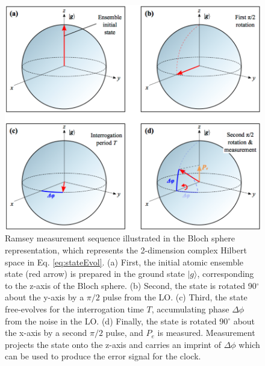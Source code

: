 \begin{figure}[hp]
    \begin{center}
        \includegraphics{figures/5/Fig_BlochRamsey2}
        \caption{\label{fig:bloch} Ramsey measurement sequence illustrated in the Bloch sphere representation, which represents the 2-dimension complex Hilbert space in  Eq. \ref{eq:stateEvol}. (a) First, the initial atomic ensemble state (red arrow) is prepared in the ground state $|g \rangle$, corresponding to the z-axis of the Bloch sphere. (b) Second, the state is rotated 90$^{\circ}$ about the y-axis by a $\pi / 2$ pulse from the LO. (c) Third, the state free-evolves for the interrogation time $T$, accumulating phase $\Delta \phi$ from the noise in the LO. (d) Finally, the state is rotated 90$^{\circ}$ about the x-axis by a second $\pi / 2$ pulse, and $P_e$ is measured. Measurement projects the state onto the z-axis and carries an imprint of $\Delta \phi$ which can be used to produce the error signal for the clock. }
    \end{center}
\end{figure}


